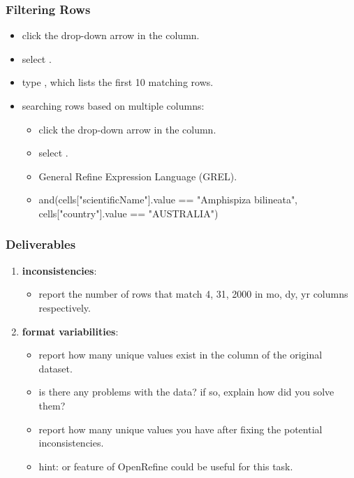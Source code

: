 \documentclass{beamer}					%
\begin{document}
\begin{frame}[c]
\frametitle{Filtering Rows}
\begin{itemize}
\item click the drop-down arrow in the  column.
\item select \say{\textcolor{red}{Text Filter}}.
\item type , which lists the first 10 matching rows.
\item searching rows based on multiple columns:
\begin{itemize}
\item click the drop-down arrow in the  column.
\item select \say{\textcolor{red}{Facet\textgreater Custom text facet...}}.
\item General Refine Expression Language (GREL).
\item and(cells["scientificName"].value == "Amphispiza bilineata", cells["country"].value == "AUSTRALIA")
\end{itemize}
\end{itemize}
\end{frame}

 \begin{frame}[c]
 \frametitle{Deliverables}
 \begin{enumerate}
 \item \textbf{inconsistencies}: 
 \begin{itemize}
\item report the number of rows that match 4, 31, 2000 in mo, dy, yr columns respectively.
\end{itemize}
\item \textbf{format variabilities}:
\begin{itemize}
\item report how many unique values exist in the  column of the original dataset.
\item is there any problems with the data? if so, explain how did you solve them? 
\item report how many unique values you have after fixing the potential inconsistencies.
\item hint:  or  feature of OpenRefine could be useful for this task.
 \end{itemize}
\setcounter{enumTemp}{\theenumi}
 \end{enumerate}
\end{frame}
\end{document}
